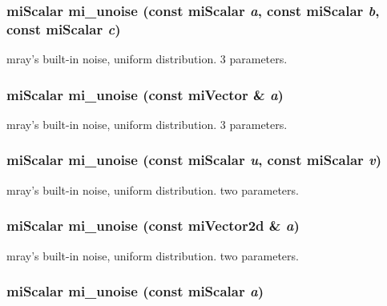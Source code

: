 \subsubsection{\setlength{\rightskip}{0pt plus 5cm}mi\-Scalar mi\_\-unoise (const mi\-Scalar {\em a}, const mi\-Scalar {\em b}, const mi\-Scalar {\em c})\hspace{0.3cm}{\tt  [inline]}}\label{namespacersl_a116}


mray's built-in noise, uniform distribution. 3 parameters. 

\subsubsection{\setlength{\rightskip}{0pt plus 5cm}mi\-Scalar mi\_\-unoise (const mi\-Vector \& {\em a})\hspace{0.3cm}{\tt  [inline]}}\label{namespacersl_a115}


mray's built-in noise, uniform distribution. 3 parameters. 

\subsubsection{\setlength{\rightskip}{0pt plus 5cm}mi\-Scalar mi\_\-unoise (const mi\-Scalar {\em u}, const mi\-Scalar {\em v})\hspace{0.3cm}{\tt  [inline]}}\label{namespacersl_a114}


mray's built-in noise, uniform distribution. two parameters. 

\subsubsection{\setlength{\rightskip}{0pt plus 5cm}mi\-Scalar mi\_\-unoise (const mi\-Vector2d \& {\em a})\hspace{0.3cm}{\tt  [inline]}}\label{namespacersl_a113}


mray's built-in noise, uniform distribution. two parameters. 

\subsubsection{\setlength{\rightskip}{0pt plus 5cm}mi\-Scalar mi\_\-unoise (const mi\-Scalar {\em a})\hspace{0.3cm}{\tt  [inline]}}\label{namespacersl_a112}


